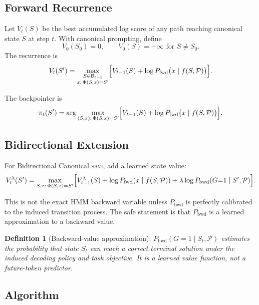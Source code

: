 \documentclass[11pt,letterpaper]{article}
\newtheorem{definition}{Definition}
\newcommand{\Phifn}{\Phi}
\newcommand{\Pfwd}{P_{\mathrm{fwd}}}
\newcommand{\Pbwd}{P_{\mathrm{bwd}}}
\newcommand{\calP}{\mathcal{P}}
\newcommand{\SAVI}{\textsc{savi}\xspace}
\begin{document}
\subsection{Forward Recurrence}

Let $V_t(S)$ be the best accumulated log score of any path reaching canonical state $S$ at step $t$.
With canonical prompting, define
\[
  V_0(S_0) = 0, \qquad V_0(S) = -\infty \text{ for } S \neq S_0.
\]
The recurrence is
\begin{equation}
  V_t(S') = \max_{\substack{S \in \mathcal{B}_{t-1} \\ x:\,\Phifn(S,x) = S'}}
    \Bigl[V_{t-1}(S) + \log \Pfwd\bigl(x \mid f(S, \calP)\bigr)\Bigr].
  \label{eq:viterbi-dp}
\end{equation}

The backpointer is
\[
  \pi_t(S') = \arg\max_{(S,x):\,\Phifn(S,x) = S'}
    \Bigl[V_{t-1}(S) + \log \Pfwd\bigl(x \mid f(S, \calP)\bigr)\Bigr].
\]

\subsection{Bidirectional Extension}

For Bidirectional Canonical \SAVI, add a learned state value:
\begin{equation}
  V_t^\lambda(S') = \max_{S,x:\,\Phifn(S,x) = S'}
    \Bigl[V_{t-1}^\lambda(S) + \log \Pfwd(x \mid f(S,\calP))
      + \lambda \log \Pbwd(G{=}1 \mid S', \calP)\Bigr].
  \label{eq:bidir-dp}
\end{equation}

This is not the exact HMM backward variable unless $\Pbwd$ is perfectly calibrated to the induced
transition process.
The safe statement is that $\Pbwd$ is a learned approximation to a backward value.

\begin{definition}[Backward-value approximation]
$\Pbwd(G{=}1 \mid S_t, \calP)$ estimates the probability that state $S_t$ can reach a correct
terminal solution under the induced decoding policy and task objective.
It is a \emph{learned value function}, not a future-token predictor.
\end{definition}

\subsection{Algorithm}
\end{document}
